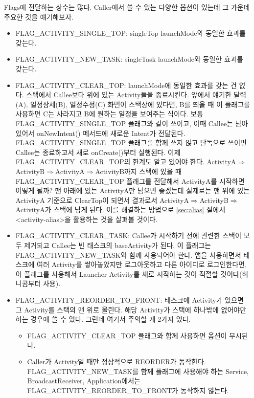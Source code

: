 Flags에 전달하는 상수는 많다. Caller에서 쓸 수 있는 다양한 옵션이 있는데 그 가운데 주요한 것을 얘기해보자.
\begin{itemize}
\item FLAG\_ACTIVITY\_SINGLE\_TOP: singleTop launchMode와 동일한 효과를 갖는다.
\item FLAG\_ACTIVITY\_NEW\_TASK: singleTask launchMode와 동일한 효과를 갖는다.

\item FLAG\_ACTIVITY\_CLEAR\_TOP: launchMode에 동일한 효과를 갖는 건 없다. 스택에서 Callee보다 위에 있는 Activity들을 종료시킨다. 앞에서 얘기한 달력(A), 일정상세(B), 일정수정(C) 화면이 스택상에 있다면, B를 띄울 때 이 플래그를 사용하면 C는 사라지고 B에 원하는 일정을 보여주는 식이다. 보통 FLAG\_ACTIVITY\_SINGLE\_TOP 플래그와 같이 쓰이고, 이때 Callee는 남아있어서 onNewIntent() 메서드에 새로운 Intent가 전달된다. FLAG\_ACTIVITY\_SINGLE\_TOP 플래그를 함께 쓰지 않고 단독으로 쓰이면 Callee는 종료하고서 새로 onCreate()부터 실행된다.
이제 FLAG\_ACTIVITY\_CLEAR\_TOP의 한계도 알고 있어야 한다. ActivityA$\Rightarrow$ActivityB$\Rightarrow$Activi\-tyA$\Rightarrow$ActivityB까지 스택에 있을 때 FLAG\_ACTI\-VITY\_CLEAR\_TOP 플래그를 전달해서 ActivityA를 시작하면 어떻게 될까? 맨 아래에 있는 ActivityA만 남으면 좋겠는데 실제로는 맨 위에 있는 ActivityA 기준으로 ClearTop이 되면서 결과로서 ActivityA$\Rightarrow$ActivityB$\Rightarrow$ActivityA가 스택에 남게 된다. 이를 해결하는 방법으로 \ref{sec:alias} 절에서 <activity-alias>을 활용하는 것을 살펴볼 것이다. 

\item FLAG\_ACTIVITY\_CLEAR\_TASK: Callee가 시작하기 전에 관련한 스택이 모두 제거되고 Callee는 빈 태스크의 baseActivity가 된다. 이 플래그는 FLAG\_ACTIVITY\_NEW\_TASK와 함께 사용되어야 한다. 앱을 사용하면서 태스크에 여러 Activity를 쌓아놓았지만 로그아웃하고 다른 아이디로 로그인한다면, 이 플래그를 사용해서 Launcher Activity를 새로 시작하는 것이 적절할 것이다(허니콤부터 사용).
\item FLAG\_ACTIVITY\_REORDER\_TO\_FRONT: 태스크에 Activity가 있으면 그 Activity를 스택의 맨 위로 올린다. 해당 Activity가 스택에 하나밖에 없어야만 하는 경우에 쓸 수 있다.
그런데 여기서 주의할 게 2가지 있다. 
\begin{itemize}
\item FLAG\_ACTIVITY\_CLEAR\_TOP 플래그와 함께 사용하면 옵션이 무시된다. 
\item Caller가 Activity일 때만 정상적으로 REORDER가 동작한다. FLAG\_ACTIVITY\_NEW\_TASK를 함께 플래그에 사용해야 하는 Service, BroadcastReceiver, Application에서는 FLAG\_ACTIVI\-TY\_RE\-ORDER\_TO\_FRONT가 동작하지 않는다.
\end{itemize}
\end{itemize}

